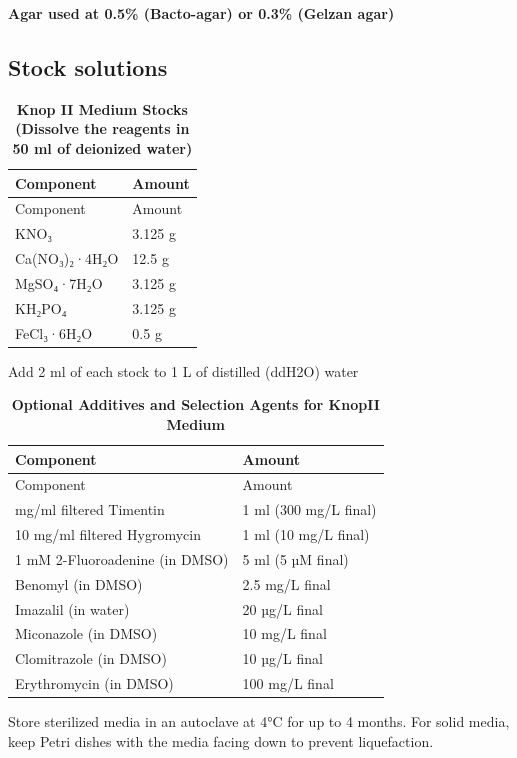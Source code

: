 \documentclass[
  11pt,
]{article}
\begin{document}
\textbf{Agar used at 0.5\% (Bacto-agar) or 0.3\% (Gelzan agar)}

\subsection{Stock solutions}\label{stock-solutions-1}

\begin{longtable}[]{@{}ll@{}}
\caption{\textbf{Knop II Medium Stocks (Dissolve the reagents in 50 ml
of deionized water)}}\tabularnewline
\toprule\noalign{}
Component & Amount \\
\midrule\noalign{}
\endfirsthead
\toprule\noalign{}
Component & Amount \\
\midrule\noalign{}
\endhead
\bottomrule\noalign{}
\endlastfoot
KNO₃ & 3.125 g \\
Ca(NO₃)₂·4H₂O & 12.5 g \\
MgSO₄·7H₂O & 3.125 g \\
KH₂PO₄ & 3.125 g \\
FeCl₃·6H₂O & 0.5 g \\
\end{longtable}

Add 2 ml of each stock to 1 L of distilled (ddH2O) water

\begin{longtable}[]{@{}ll@{}}
\caption{\textbf{Optional Additives and Selection Agents for KnopII
Medium}}\tabularnewline
\toprule\noalign{}
Component & Amount \\
\midrule\noalign{}
\endfirsthead
\toprule\noalign{}
Component & Amount \\
\midrule\noalign{}
\endhead
\bottomrule\noalign{}
\endlastfoot
300 mg/ml filtered Timentin & 1 ml (300 mg/L final) \\
10 mg/ml filtered Hygromycin & 1 ml (10 mg/L final) \\
1 mM 2-Fluoroadenine (in DMSO) & 5 ml (5 µM final) \\
Benomyl (in DMSO) & 2.5 mg/L final \\
Imazalil (in water) & 20 µg/L final \\
Miconazole (in DMSO) & 10 mg/L final \\
Clomitrazole (in DMSO) & 10 µg/L final \\
Erythromycin (in DMSO) & 100 mg/L final \\
\end{longtable}

Store sterilized media in an autoclave at 4°C for up to 4 months. For
solid media, keep Petri dishes with the media facing down to prevent
liquefaction.
\end{document}
